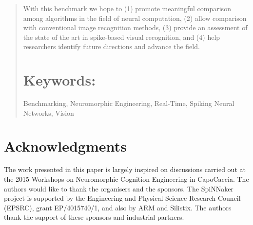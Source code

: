 \documentclass[pdftex]{bioinfo}
\begin{document}
\begin{abstract}
With this benchmark we hope to (1) promote meaningful comparison among algorithms in the field of neural computation, (2) allow comparison with conventional image recognition methods, (3) provide an assessment of the state of the art in spike-based visual recognition, and (4) help researchers identify future directions and advance the field.

\tiny
\section{Keywords:} Benchmarking, Neuromorphic Engineering, Real-Time, Spiking Neural Networks, Vision
\end{abstract}







\section*{Acknowledgments}
The work presented in this paper is largely inspired on discussions carried out at the 2015 Workshops on Neuromorphic Cognition Engineering in CapoCaccia.
The authors would like to thank the organisers and the sponsors.
The SpiNNaker project is supported by the Engineering and Physical Science Research Council (EPSRC), grant EP/4015740/1, and also by ARM and Silistix. The authors thank the support of these sponsors and industrial partners.


\end{document}
